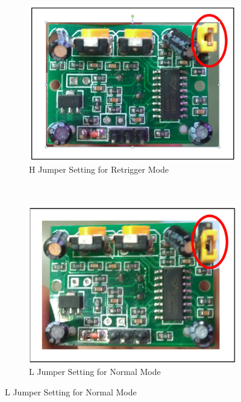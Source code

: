 \documentclass[a4paper,12 pt]{article}
\begin{document}
\begin{figure}[h]
        \centering
        \begin{subfigure}[b]{0.45\textwidth}
                \includegraphics[width=\textwidth]{H.png}
                \caption{ H Jumper Setting for Retrigger Mode}
                \label{fig:6a}
        \end{subfigure}%
        ~ %
        \begin{subfigure}[b]{0.45\textwidth}
                \includegraphics[width=\textwidth]{L.png}
                \caption{L Jumper Setting for Normal Mode}
                \label{fig:6b}
        \end{subfigure}
        
\end{figure}
\end{document}
